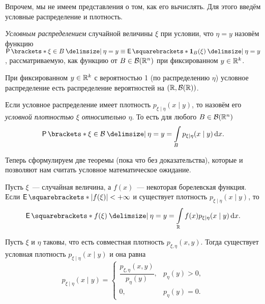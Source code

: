 Впрочем, мы не имеем представления о том, как его вычислять. Для этого введём условные распределение и плотность.
\begin{definition}
	\emph{Условным распределением} случайной величины \(\xi\) при условии, что \(\eta = y\) назовём функцию \(\Pr{\xi \in B \given \eta = y} \equiv \E{\mathbf{1}_{B}(\xi) \given \eta = y}\), рассматриваемую, как функцию от \(B \in \mathcal{B}(\mathbb{R}^n)\) при фиксированном \(y \in \mathbb{R}^k\).
\end{definition}

\begin{point}
	При фиксированном \(y \in \mathbb{R}^k\) с вероятностью 1 (по распределению \(\eta\)) условное распределение есть распределение вероятностей на \((\mathbb{R}, \mathcal{B}(\mathbb{R}))\).
\end{point}

\begin{definition}
	Если условное распределение имеет плотность \(p_{\xi \mid \eta}(x \mid y)\), то назовём его \emph{условной плотностью \(\xi\) относительно \(\eta\)}. То есть для любого \(B \in \mathcal{B}(\mathbb{R}^n)\)
	\[
		\Pr{\xi \in \B \given \eta = y} = \int\limits_{B} p_{\xi \mid \eta}(x \mid y)\diff x.
	\]
\end{definition}

Теперь сформулируем две теоремы (пока что без доказательства), которые и позволяют нам считать условное математическое ожидание.
\begin{theorem}
	Пусть \(\xi\)~--- случайная величина, а \(f(x)\)~--- некоторая борелевская функция. Если \(\E{|f(\xi)|} < +\infty\) и существует плотность \(p_{\xi \mid \eta}(x \mid y)\), то
	\[
		\E{f(\xi) \given \eta = y} = \int\limits_{\R} f(x)p_{\xi \mid \eta}(x \mid y)\diff x.
	\]
\end{theorem}
\begin{theorem}
	Пусть \(\xi\) и \(\eta\) таковы, что есть совместная плотность \(p_{\xi, \eta}(x, y)\). Тогда существует условная плотность \(p_{\xi \mid \eta}(x \mid y)\) и она равна
	\[
		p_{\xi \mid \eta}(x \mid y) = \begin{cases}
		\dfrac{p_{\xi, \eta}(x, y)}{p_{\eta}(y)},& p_{\eta}(y) > 0, \\
		0,& p_{\eta}(y) = 0.
		\end{cases}
	\]
\end{theorem}

